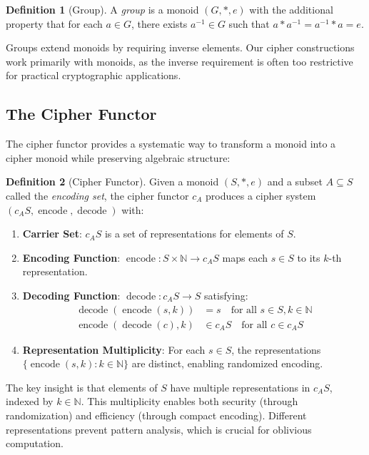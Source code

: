\documentclass[11pt]{article}
\theoremstyle{definition}
\newtheorem{definition}{Definition}[section]
\theoremstyle{plain}
\theoremstyle{remark}
\newcommand{\cipher}[1]{c_{#1}}
\newcommand{\encode}{\operatorname{encode}}
\newcommand{\decode}{\operatorname{decode}}
\begin{document}
\begin{definition}[Group]
A \emph{group} is a monoid $(G, *, e)$ with the additional property that for each $a \in G$, there exists $a^{-1} \in G$ such that $a * a^{-1} = a^{-1} * a = e$.
\end{definition}

Groups extend monoids by requiring inverse elements. Our cipher constructions work primarily with monoids, as the inverse requirement is often too restrictive for practical cryptographic applications.

\subsection{The Cipher Functor}

The cipher functor provides a systematic way to transform a monoid into a cipher monoid while preserving algebraic structure:

\begin{definition}[Cipher Functor]
\label{def:cipher-functor}
Given a monoid $(S, *, e)$ and a subset $A \subseteq S$ called the \emph{encoding set}, the cipher functor $\cipher{A}$ produces a cipher system $(\cipher{A}S, \encode, \decode)$ with:
\begin{enumerate}
\item \textbf{Carrier Set}: $\cipher{A}S$ is a set of representations for elements of $S$.

\item \textbf{Encoding Function}: $\encode: S \times \mathbb{N} \to \cipher{A}S$ maps each $s \in S$ to its $k$-th representation.

\item \textbf{Decoding Function}: $\decode: \cipher{A}S \to S$ satisfying:
   \begin{align}
   \decode(\encode(s, k)) &= s \quad \text{for all } s \in S, k \in \mathbb{N}\\
   \encode(\decode(c), k) &\in \cipher{A}S \quad \text{for all } c \in \cipher{A}S
   \end{align}

\item \textbf{Representation Multiplicity}: For each $s \in S$, the representations $\{\encode(s,k) : k \in \mathbb{N}\}$ are distinct, enabling randomized encoding.
\end{enumerate}
\end{definition}

The key insight is that elements of $S$ have multiple representations in $\cipher{A}S$, indexed by $k \in \mathbb{N}$. This multiplicity enables both security (through randomization) and efficiency (through compact encoding). Different representations prevent pattern analysis, which is crucial for oblivious computation.
\end{document}
